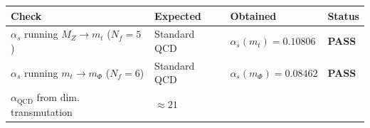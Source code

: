 \documentclass[
  11pt,
]{article}
\begin{document}
\begin{longtable}[]{@{}llll@{}}
\toprule
\begin{minipage}[b]{0.22\columnwidth}\raggedright
Check\strut
\end{minipage} & \begin{minipage}[b]{0.22\columnwidth}\raggedright
Expected\strut
\end{minipage} & \begin{minipage}[b]{0.22\columnwidth}\raggedright
Obtained\strut
\end{minipage} & \begin{minipage}[b]{0.22\columnwidth}\raggedright
Status\strut
\end{minipage}\tabularnewline
\midrule
\endhead
\begin{minipage}[t]{0.22\columnwidth}\raggedright
\(\alpha_s\) running \(M_Z \to m_t\) (\(N_f = 5\))\strut
\end{minipage} & \begin{minipage}[t]{0.22\columnwidth}\raggedright
Standard QCD\strut
\end{minipage} & \begin{minipage}[t]{0.22\columnwidth}\raggedright
\(\alpha_s(m_t) = 0.10806\)\strut
\end{minipage} & \begin{minipage}[t]{0.22\columnwidth}\raggedright
\textbf{PASS}\strut
\end{minipage}\tabularnewline
\begin{minipage}[t]{0.22\columnwidth}\raggedright
\(\alpha_s\) running \(m_t \to m_\Phi\) (\(N_f = 6\))\strut
\end{minipage} & \begin{minipage}[t]{0.22\columnwidth}\raggedright
Standard QCD\strut
\end{minipage} & \begin{minipage}[t]{0.22\columnwidth}\raggedright
\(\alpha_s(m_\Phi) = 0.08462\)\strut
\end{minipage} & \begin{minipage}[t]{0.22\columnwidth}\raggedright
\textbf{PASS}\strut
\end{minipage}\tabularnewline
\begin{minipage}[t]{0.22\columnwidth}\raggedright
\(\alpha_\text{QCD}\) from dim. transmutation\strut
\end{minipage} & \begin{minipage}[t]{0.22\columnwidth}\raggedright
\(\approx 21\)\strut
\end{minipage} & \begin{minipage}[t]{0.22\columnwidth}\raggedright

\end{minipage}
\end{longtable}
\end{document}
